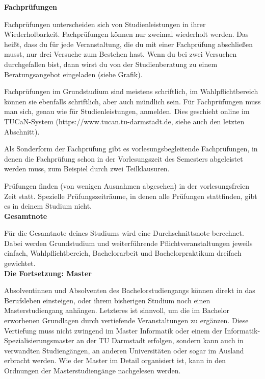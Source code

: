 {    \noindent\textbf{Fachprüfungen}

    Fachprüfungen unterscheiden sich von Studienleistungen in ihrer Wiederholbarkeit. Fachprüfungen können nur zweimal wiederholt werden. Das heißt, dass du für jede Veranstaltung, die du mit einer Fachprüfung abschließen musst, nur drei Versuche zum Bestehen hast. Wenn du bei zwei Versuchen durchgefallen bist, dann wirst du von der Studienberatung zu einem Beratungsangebot eingeladen (siehe Grafik).


    Fachprüfungen im Grundstudium sind meistens schriftlich, im Wahlpflichtbereich können sie ebenfalls schriftlich, aber auch mündlich sein. Für Fachprüfungen muss man sich, genau wie für Studienleistungen, anmelden. Dies geschieht online im TUCaN-System (https://www.tucan.tu-darmstadt.de, siehe auch den letzten Abschnitt).

    Als Sonderform der Fachprüfung gibt es vorlesungsbegleitende Fachprüfungen, in denen die Fachprüfung schon in der Vorlesungszeit des Semesters abgeleistet werden muss, zum Beispiel durch zwei Teilklausuren.

    Prüfungen finden (von wenigen Ausnahmen abgesehen) in der vorlesungsfreien Zeit statt. Spezielle Prüfungszeiträume, in denen alle Prüfungen stattfinden, gibt es in deinem Studium nicht.\\

    \noindent\textbf{Gesamtnote}

    Für die Gesamtnote deines Studiums wird eine Durchschnittsnote berechnet. Dabei werden Grundstudium und weiterführende Pflichtveranstaltungen jeweils einfach, Wahlpflichtbereich, Bachelorarbeit und Bachelorpraktikum dreifach gewichtet.\\

    \noindent\textbf{Die Fortsetzung: Master}

    Absolventinnen und Absolventen des Bachelorstudiengangs können direkt in das Berufsleben einsteigen, oder ihrem bisherigen Studium noch einen Masterstudiengang anhängen. Letzteres ist sinnvoll, um die im Bachelor erworbenen Grundlagen durch vertiefende Veranstaltungen zu ergänzen. Diese Vertiefung muss nicht zwingend im Master Informatik oder einem der Informatik-Spezialisierungsmaster an der TU Darmstadt erfolgen, sondern kann auch in verwandten Studiengängen, an anderen Universitäten oder sogar im Ausland erbracht werden. Wie der Master im Detail organisiert ist, kann in den Ordnungen der Masterstudiengänge nachgelesen werden.

}
